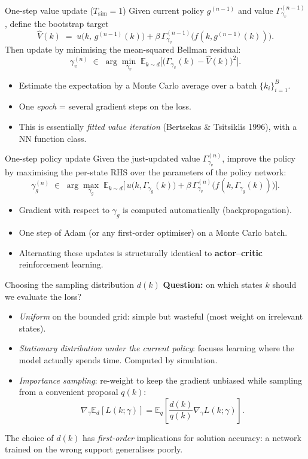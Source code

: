 \documentclass[10pt,english,aspectratio=169]{beamer}
\begin{document}
\begin{frame}{One-step value update ($T_{\text{sim}}=1$)}
Given current policy $g^{(n-1)}$ and value $\Gamma_{\gamma_v}^{(n-1)}$, define the bootstrap target
\[
\hat V(k) \;=\; u\!\big(k,\, g^{(n-1)}(k)\big) + \beta\,\Gamma_{\gamma_v}^{(n-1)}\!\big(f(k, g^{(n-1)}(k))\big).
\]
\medskip
Then update by minimising the mean-squared Bellman residual:
\[
\gamma_v^{(n)} \;\in\; \arg\min_{\gamma_v}\; \mathbb{E}_{k\sim d}\Big[\big(\Gamma_{\gamma_v}(k) - \hat V(k)\big)^2\Big].
\]
\medskip
\begin{itemize}
\item Estimate the expectation by a Monte Carlo average over a batch $\{k_i\}_{i=1}^{B}$.
\item One \emph{epoch} = several gradient steps on the loss.
\item This is essentially \emph{fitted value iteration} (Bertsekas \& Tsitsiklis 1996), with a NN function class.
\end{itemize}
\end{frame}

\begin{frame}{One-step policy update}
Given the just-updated value $\Gamma_{\gamma_v}^{(n)}$, improve the policy by maximising the per-state RHS over the parameters of the policy network:
\[
\gamma_g^{(n)} \;\in\; \arg\max_{\gamma_g}\;
\mathbb{E}_{k\sim d}\Big[\,u\!\big(k,\Gamma_{\gamma_g}(k)\big) + \beta\,\Gamma_{\gamma_v}^{(n)}\!\big(f(k,\Gamma_{\gamma_g}(k))\big)\Big].
\]
\medskip
\begin{itemize}
\item Gradient with respect to $\gamma_g$ is computed automatically (backpropagation).
\item One step of Adam (or any first-order optimiser) on a Monte Carlo batch.
\item Alternating these updates is structurally identical to \textbf{actor--critic} reinforcement learning.
\end{itemize}
\end{frame}

\begin{frame}{Choosing the sampling distribution $d(k)$}
\textbf{Question:} on which states $k$ should we evaluate the loss?
\medskip
\begin{itemize}
\item \emph{Uniform} on the bounded grid: simple but wasteful (most weight on irrelevant states).
\medskip
\item \emph{Stationary distribution under the current policy}: focuses learning where the model actually spends time. Computed by simulation.
\medskip
\item \emph{Importance sampling}: re-weight to keep the gradient unbiased while sampling from a convenient proposal $q(k)$:
\[
\nabla_{\gamma}\mathbb{E}_{d}[L(k;\gamma)] = \mathbb{E}_q\!\left[\frac{d(k)}{q(k)}\nabla_\gamma L(k;\gamma)\right].
\]
\end{itemize}
\medskip
The choice of $d(k)$ has \emph{first-order} implications for solution accuracy: a network trained on the wrong support generalises poorly.
\end{frame}
\end{document}
